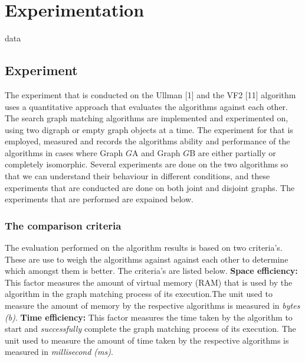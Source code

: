 \section{Experimentation}
\label{Experimentation}

{data}

\subsection{Experiment}
The experiment that is conducted on the Ullman [1] and the VF2 [11] algorithm uses a quantitative approach that evaluates the algorithms against each 
other. The search graph matching algorithms are implemented and experimented on, using two digraph or empty graph objects at a time. The experiment for that is 
employed, measured and records the algorithms ability and performance of the algorithms in cases where Graph $G${\tiny A} and Graph $G${\tiny B} are 
either partially or completely isomorphic.\newline\newline
Several experiments are done on the two algorithms so that we can understand their behaviour in different conditions, and these experiments that are conducted 
are done on both joint and disjoint graphs. The experiments that are performed are expained below.

\subsubsection{The comparison criteria}
\label{The comparison criteria}
The evaluation performed on the algorithm results is based on two criteria's. These are use to weigh the algorithms against against each other to determine which amongst them is better. The criteria's are listed below.\newline\newline
\textbf{Space efficiency:} This factor measures the amount of virtual memory (RAM) that is used by the algorithm in the graph matching process of its
execution.The unit used to measure the amount of memory  by the respective algorithms is measured in \textit{bytes (b)}. \newline\newline
\textbf{Time efficiency:} This factor measures the time taken by the algorithm to start and \textit{successfully} complete the graph matching process of its
execution. The unit used to measure the amount of time taken by the respective algorithms is measured in \textit{millisecond (ms)}. 

